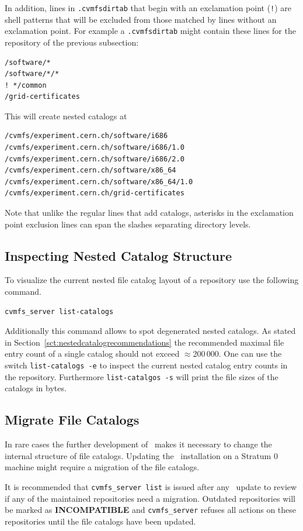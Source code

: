 In addition, lines in \texttt{.cvmfsdirtab} that begin with an exclamation point (\texttt{!}) are shell patterns that will be excluded from those matched by lines without an exclamation point.
For example a \texttt{.cvmfsdirtab} might contain these lines for the repository of the previous subsection:
\begin{verbatim}
/software/*
/software/*/*
! */common
/grid-certificates
\end{verbatim}
This will create nested catalogs at
\begin{verbatim}
/cvmfs/experiment.cern.ch/software/i686
/cvmfs/experiment.cern.ch/software/i686/1.0
/cvmfs/experiment.cern.ch/software/i686/2.0
/cvmfs/experiment.cern.ch/software/x86_64
/cvmfs/experiment.cern.ch/software/x86_64/1.0
/cvmfs/experiment.cern.ch/grid-certificates
\end{verbatim}
Note that unlike the regular lines that add catalogs, asterisks in the exclamation point exclusion lines can span the slashes separating directory levels.

\subsection{Inspecting Nested Catalog Structure}
\label{sct:inspectnestedcatalogs}
To visualize the current nested file catalog layout of a repository use the following command.

\begin{verbatim}
cvmfs_server list-catalogs
\end{verbatim}

Additionally this command allows to spot degenerated nested catalogs.
As stated in Section~\ref{sct:nestedcatalogrecommendations} the recommended maximal file entry count of a single catalog should not exceed $\approx$200\,000.
One can use the switch \texttt{list-catalogs -e} to inspect the current nested catalog entry counts in the repository.
Furthermore \texttt{list-catalgos -s} will print the file sizes of the catalogs in bytes.

\subsection{Migrate File Catalogs}
In rare cases the further development of \cvmfs\ makes it necessary to change the internal structure of file catalogs.
Updating the \cvmfs\ installation on a Stratum 0 machine might require a migration of the file catalogs.

It is recommended that \texttt{cvmfs\_server list} is issued after any \cvmfs\ update to review if any of the maintained repositories need a migration.
Outdated repositories will be marked as \textbf{INCOMPATIBLE} and \texttt{cvmfs\_server} refuses all actions on these repositories until the file catalogs have been updated.

